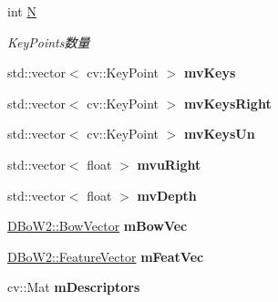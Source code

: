 \begin{DoxyCompactItemize}
\item 
\hypertarget{classORB__SLAM2_1_1Frame_a0035828f1744f1bdd4ae8681e7cbbd32}{int \hyperlink{classORB__SLAM2_1_1Frame_a0035828f1744f1bdd4ae8681e7cbbd32}{N}}\label{classORB__SLAM2_1_1Frame_a0035828f1744f1bdd4ae8681e7cbbd32}

\begin{DoxyCompactList}\small\item\em Key\-Points数量 \end{DoxyCompactList}\item 
\hypertarget{classORB__SLAM2_1_1Frame_a86563de6facec0433e31f726723057e4}{std\-::vector$<$ cv\-::\-Key\-Point $>$ {\bfseries mv\-Keys}}\label{classORB__SLAM2_1_1Frame_a86563de6facec0433e31f726723057e4}

\item 
\hypertarget{classORB__SLAM2_1_1Frame_a15b04baf8fc5282883ccc002eb703a8e}{std\-::vector$<$ cv\-::\-Key\-Point $>$ {\bfseries mv\-Keys\-Right}}\label{classORB__SLAM2_1_1Frame_a15b04baf8fc5282883ccc002eb703a8e}

\item 
\hypertarget{classORB__SLAM2_1_1Frame_a13737fa65f0ce693275f1919240bac35}{std\-::vector$<$ cv\-::\-Key\-Point $>$ {\bfseries mv\-Keys\-Un}}\label{classORB__SLAM2_1_1Frame_a13737fa65f0ce693275f1919240bac35}

\item 
\hypertarget{classORB__SLAM2_1_1Frame_a09a1957b966542e640ecabc41ec76c16}{std\-::vector$<$ float $>$ {\bfseries mvu\-Right}}\label{classORB__SLAM2_1_1Frame_a09a1957b966542e640ecabc41ec76c16}

\item 
\hypertarget{classORB__SLAM2_1_1Frame_a4232b92ebf890728291ef2a66e7d39bb}{std\-::vector$<$ float $>$ {\bfseries mv\-Depth}}\label{classORB__SLAM2_1_1Frame_a4232b92ebf890728291ef2a66e7d39bb}

\item 
\hypertarget{classORB__SLAM2_1_1Frame_a68bbc187861a8e5c0ed9d92b5308c2cb}{\hyperlink{classDBoW2_1_1BowVector}{D\-Bo\-W2\-::\-Bow\-Vector} {\bfseries m\-Bow\-Vec}}\label{classORB__SLAM2_1_1Frame_a68bbc187861a8e5c0ed9d92b5308c2cb}

\item 
\hypertarget{classORB__SLAM2_1_1Frame_a8153622c07ed98421bd7c7b2b7451b03}{\hyperlink{classDBoW2_1_1FeatureVector}{D\-Bo\-W2\-::\-Feature\-Vector} {\bfseries m\-Feat\-Vec}}\label{classORB__SLAM2_1_1Frame_a8153622c07ed98421bd7c7b2b7451b03}

\item 
\hypertarget{classORB__SLAM2_1_1Frame_a0dfc1a363215ad0a09303e612a1ffbe7}{cv\-::\-Mat {\bfseries m\-Descriptors}}\label{classORB__SLAM2_1_1Frame_a0dfc1a363215ad0a09303e612a1ffbe7}


\end{DoxyCompactItemize}
